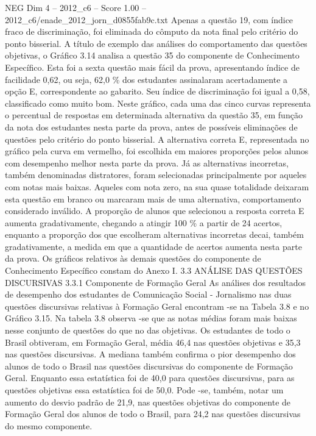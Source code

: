 \begin{textsample}{NEG Dim 4 – 2012\_c6 – Score 1.00 – 2012\_c6/enade\_2012\_jorn\_d0855fab9c.txt}
Apenas a questão 19, com índice fraco de discriminação, foi eliminada do cômputo da nota final pelo critério do ponto bisserial.
A título de exemplo das análises do comportamento das questões objetivas, o Gráfico 3.14 analisa a questão 35 do componente de Conhecimento Específico.
Esta foi a sexta questão mais fácil da prova, apresentando índice de facilidade 0,62, ou seja, 62,0 \% dos estudantes assinalaram acertadamente a opção E, correspondente ao gabarito.
Seu índice de discriminação foi igual a 0,58, classificado como muito bom.
Neste gráfico, cada uma das cinco curvas representa o percentual de respostas em determinada alternativa da questão 35, em função da nota dos estudantes nesta parte da prova, antes de possíveis eliminações de questões pelo critério do ponto bisserial.
A alternativa correta E, representada no gráfico pela curva em vermelho, foi escolhida em maiores proporções pelos alunos com desempenho melhor nesta parte da prova.
Já as alternativas incorretas, também denominadas distratores, foram selecionadas principalmente por aqueles com notas mais baixas.
Aqueles com nota zero, na sua quase totalidade deixaram esta questão em branco ou marcaram mais de uma alternativa, comportamento considerado inválido.
A proporção de alunos que selecionou a resposta correta E aumenta gradativamente, chegando a atingir 100 \% a partir de 24 acertos, enquanto a proporção dos que escolheram alternativas incorretas decai, também gradativamente, a medida em que a quantidade de acertos aumenta nesta parte da prova.
Os gráficos relativos às demais questões do componente de Conhecimento Específico constam do Anexo I. 3.3 ANÁLISE DAS QUESTÕES DISCURSIVAS 3.3.1 Componente de Formação Geral As análises dos resultados de desempenho dos estudantes de Comunicação Social - Jornalismo nas duas questões discursivas relativas à Formação Geral encontram -se na Tabela 3.8 e no Gráfico 3.15.
Na tabela 3.8 observa -se que as notas médias foram mais baixas nesse conjunto de questões do que no das objetivas.
Os estudantes de todo o Brasil obtiveram, em Formação Geral, média 46,4 nas questões objetivas e 35,3 nas questões discursivas.
A mediana também confirma o pior desempenho dos alunos de todo o Brasil nas questões discursivas do componente de Formação Geral.
Enquanto essa estatística foi de 40,0 para questões discursivas, para as questões objetivas essa estatística foi de 50,0.
Pode -se, também, notar um aumento do desvio padrão de 21,9, nas questões objetivas do componente de Formação Geral dos alunos de todo o Brasil, para 24,2 nas questões discursivas do mesmo componente.

\end{textsample}
